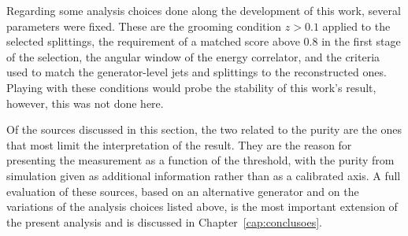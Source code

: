 Regarding some analysis choices done along the development of this work, several parameters
were fixed. These are the grooming
condition $z > 0.1$ applied to the selected splittings, the requirement of a
matched score above $0.8$ in the first stage of the selection, the angular window
of the energy correlator, and the criteria used to match the generator-level jets
and splittings to the reconstructed ones. Playing with these conditions would probe 
the stability of this work's result, however, this was not done here.

Of the sources discussed in this section, the two related to the purity are the
ones that most limit the interpretation of the result. They are the reason for
presenting the measurement as a function of the threshold, with the purity from
simulation given as additional information rather than as a calibrated axis. A
full evaluation of these sources, based on an alternative generator and on the
variations of the analysis choices listed above, is the most important extension
of the present analysis and is discussed in Chapter~\ref{cap:conclusoes}.